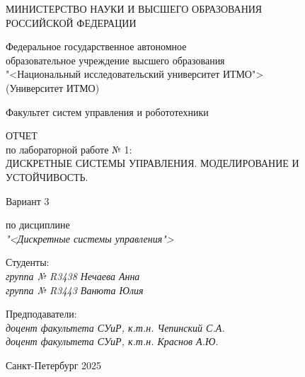 \thispagestyle{empty}

\begin{center}
    МИНИСТЕРСТВО НАУКИ И ВЫСШЕГО ОБРАЗОВАНИЯ \\ РОССИЙСКОЙ ФЕДЕРАЦИИ

    \vspace{20pt}

    Федеральное государственное автономное \\ образовательное учреждение высшего образования \\
    "<Национальный исследовательский университет ИТМО"> \\
    (Университет ИТМО)

    \vspace{20pt}

    Факультет систем управления и робототехники 
\end{center}

\vfill

\begin{center}
	ОТЧЕТ \\  
	по лабораторной работе № 1: \\
	\uppercase{Дискретные системы управления. Моделирование и устойчивость.}
	\vspace{20pt}
	
	Вариант 3 \\
	
	\vspace{20pt}
	
	по дисциплине \\
	\textit{"<Дискретные системы управления">}
	
\end{center}

\vfill

\noindent Студенты: \\
\textit{группа № R3438 \hfill Нечаева Анна}\\
\textit{группа № R3443 \hfill Ванюта Юлия}

\vspace{20pt}

\noindent Предподаватели: \\
\textit{доцент факультета СУиР, к.т.н. \hfill Чепинский С.А.}\\
\textit{доцент факультета СУиР, к.т.н. \hfill Краснов А.Ю.}

\vfill

\begin{center}
    Санкт-Петербург 2025
\end{center}